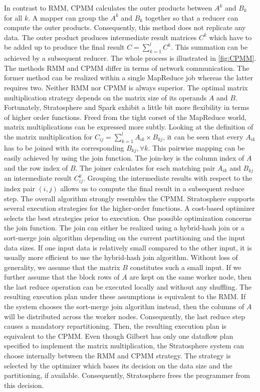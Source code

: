 In contrast to RMM, CPMM calculates the outer products between $A^k$ and $B_k$ for all $k$. A mapper can group the $A^k$ and $B_k$ together so that a reducer can compute the outer products. Consequently, this method does not replicate any data. The outer product produces intermediate result matrices $C^k$ which have to be added up to produce the final result $C=\sum_{k=1}^{l} C^k$. This summation can be achieved by a subsequent reducer. The whole process is illustrated in \cref{fig:CPMM}. The methods RMM and CPMM differ in terms of network communication. The former method can be realized within a single MapReduce job whereas the latter requires two. Neither RMM nor CPMM is always superior. The optimal matrix multiplication strategy depends on the matrix size of its operands $A$ and $B$. Fortunately, Stratosphere and Spark exhibit a little bit more flexibility in terms of higher order functions. Freed from the tight corset of the MapReduce world, matrix multiplications can be expressed more subtly. Looking at the definition of the matrix multiplication for $C_{ij}=\sum_{k=1}^{l}A_{ik}\times B_{kj}$, it can be seen that every $A_{ik}$ has to be joined with its corresponding $B_{kj},\forall k$. This pairwise mapping can be easily achieved by using the join function. The join-key is the column index of $A$ and the row index of $B$. The joiner calculates for each matching pair $A_{ik}$ and $B_{kj}$ an intermediate result $C_{ij}^k$. Grouping the intermediate results with respect to the index pair $(i,j)$ allows us to compute the final result in a subsequent reduce step. The overall algorithm strongly resembles the CPMM. Stratosphere supports several execution strategies for the higher-order functions. A cost-based optimizer selects the best strategies prior to execution. One possible optimization concerns the join function. The join can either be realized using a hybrid-hash join or a sort-merge join algorithm depending on the current partitioning and the input data sizes. If one input data is relatively small compared to the other input, it is usually more efficient to use the hybrid-hash join algorithm. Without loss of generality, we assume that the matrix $B$ constitutes such a small input. If we further assume that the block rows of $A$ are kept on the same worker node, then the last reduce operation can be executed locally and without any shuffling. The resulting execution plan under these assumptions is equivalent to the RMM. If the system chooses the sort-merge join algorithm instead, then the columns of $A$ will be distributed across the worker nodes. Consequently, the last reduce step causes a mandatory repartitioning. Then, the resulting execution plan is equivalent to the CPMM. Even though Gilbert has only one dataflow plan specified to implement the matrix multiplication, the Stratosphere system can choose internally between the RMM and CPMM strategy. The strategy is selected by the optimizer which bases its decision on the data size and the partitioning, if available. Consequently, Stratosphere frees the programmer from this decision.